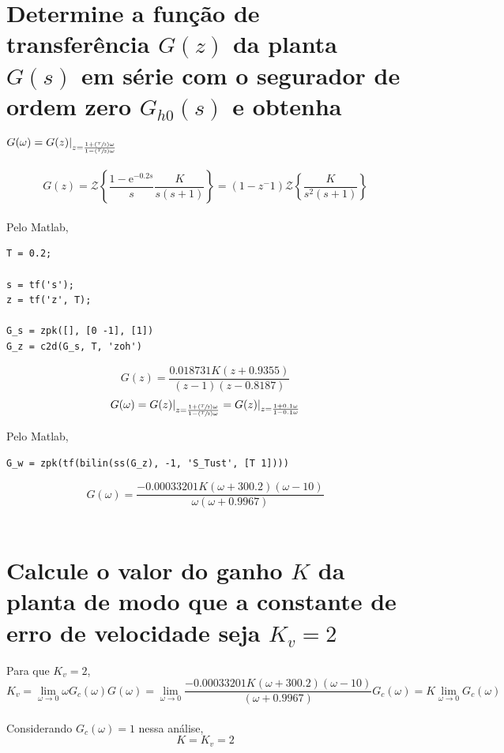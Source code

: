 \documentclass{article}
\begin{document}
\section{\normalsize{Determine a função de transferência $G(z)$ da planta $G(s)$ em série com o segurador de ordem zero $G_{h0}(s)$ e obtenha $G(\omega) = G(z)|_{z = \frac{1 + (\sfrac{T}{2})\omega}{1 - (\sfrac{T}{2})\omega}}$}}

    $$ G(z) = \mathcal{Z}\left\{\frac{ 1 - \mathrm{e}^{-0.2s} }{s} \frac{K}{s(s+1)} \right\}
            = (1-z^-1) \mathcal{Z}\left\{ \frac{K}{s^{2} (s+1)}  \right\} $$\\
    {Pelo Matlab,}
\begin{lstlisting}
T = 0.2;

s = tf('s');
z = tf('z', T);

G_s = zpk([], [0 -1], [1])
G_z = c2d(G_s, T, 'zoh')
\end{lstlisting}
    $$ G(z) = \frac{ 0.018731K(z+0.9355) }{ (z-1)(z-0.8187) } $$
    $$ G(\omega) = G(z)|_{z = \frac{1 + (\sfrac{T}{2})\omega}{1 - (\sfrac{T}{2})\omega}} = G(z)|_{z = \frac{1 + 0.1\omega}{1 - 0.1\omega}} $$

    {Pelo Matlab,}
\begin{lstlisting}
G_w = zpk(tf(bilin(ss(G_z), -1, 'S_Tust', [T 1])))
\end{lstlisting}

    $$ G(\omega) = \frac{-0.00033201K(\omega + 300.2)(\omega -10)}{\omega(\omega + 0.9967)} $$\\


\section{\normalsize{Calcule o valor do ganho $K$ da planta de modo que a constante de erro de velocidade seja $K_v = 2$}}
    {Para que $K_v = 2$,}
    $$ K_v = \lim\limits_{\omega \to 0} \omega G_c(\omega)G(\omega)
           = \lim\limits_{\omega \to 0} \frac{-0.00033201K(\omega + 300.2)(\omega -10)}{(\omega + 0.9967)} G_c(\omega)
           = K \lim\limits_{\omega \to 0} G_c(\omega) $$\\

    {Considerando $G_c(\omega) = 1$ nessa análise,}
    $$ K = K_v = 2 $$
\end{document}

